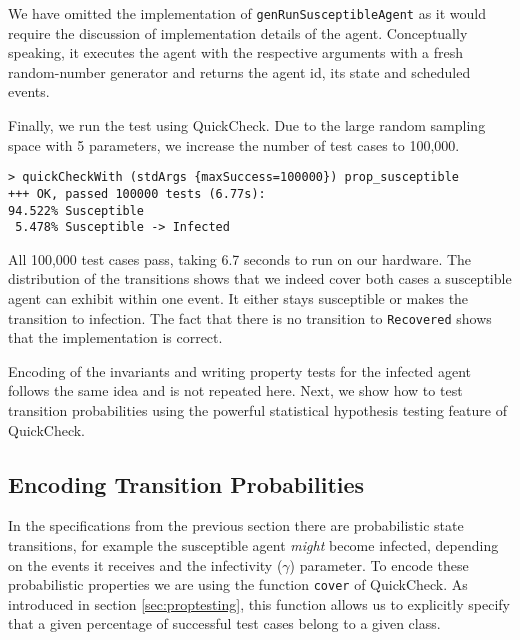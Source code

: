 We have omitted the implementation of \texttt{genRunSusceptibleAgent} as it would require the discussion of implementation details of the agent. Conceptually speaking, it executes the agent with the respective arguments with a fresh random-number generator and returns the agent id, its state and scheduled events.

Finally, we run the test using QuickCheck. Due to the large random sampling space with 5 parameters, we increase the number of test cases to 100,000.

\begin{footnotesize}
\begin{verbatim}
> quickCheckWith (stdArgs {maxSuccess=100000}) prop_susceptible
+++ OK, passed 100000 tests (6.77s):
94.522% Susceptible
 5.478% Susceptible -> Infected
\end{verbatim}
\end{footnotesize}

All 100,000 test cases pass, taking 6.7 seconds to run on our hardware. The distribution of the transitions shows that we indeed cover both cases a susceptible agent can exhibit within one event. It either stays susceptible or makes the transition to infection. The fact that there is no transition to \texttt{Recovered} shows that the implementation is correct.

Encoding of the invariants and writing property tests for the infected agent follows the same idea and is not repeated here. Next, we show how to test transition probabilities using the powerful statistical hypothesis testing feature of QuickCheck.

\subsection{Encoding Transition Probabilities}
In the specifications from the previous section there are probabilistic state transitions, for example the susceptible agent \textit{might} become infected, depending on the events it receives and the infectivity ($\gamma$) parameter. To encode these probabilistic properties we are using the function \texttt{cover} of QuickCheck. As introduced in section \ref{sec:proptesting}, this function allows us to explicitly specify that a given percentage of successful test cases belong to a given class.

